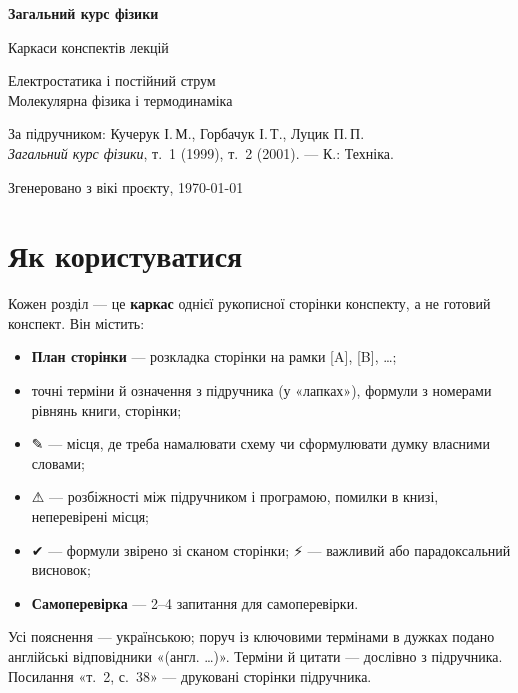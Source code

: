 \documentclass[11pt,a4paper,oneside]{book}
\newcommand{\pen}{{\sffamily\color{accent}✎}}
\newcommand{\warn}{{\sffamily\color{warncol}⚠}}
\newcommand{\ok}{{\sffamily\color{green!45!black}✔}}
\newcommand{\spark}{{\sffamily\color{warncol}⚡}}
\begin{document}
\frontmatter


\begin{titlepage}
\centering\sffamily
\vspace*{40mm}
{\Huge\bfseries\color{accent} Загальний курс фізики\par}
\vspace{6mm}
{\LARGE Каркаси конспектів лекцій\par}
\vspace{12mm}
{\large Електростатика і постійний струм\\[2mm] Молекулярна фізика і термодинаміка\par}
\vfill
{\normalsize За підручником: Кучерук І.\,М., Горбачук І.\,Т., Луцик П.\,П.\\
\textit{Загальний курс фізики}, т.~1 (1999), т.~2 (2001). — К.: Техніка.\par}
\vspace{8mm}
{\small Згенеровано з вікі проєкту, \today\par}
\end{titlepage}

\chapter*{Як користуватися}
Кожен розділ — це \textbf{каркас} однієї рукописної сторінки конспекту, а не готовий конспект. Він містить:
\begin{itemize}
\item \textbf{План сторінки} — розкладка сторінки на рамки [A], [B], …;
\item точні терміни й означення з підручника (у «лапках»), формули з номерами рівнянь книги, сторінки;
\item \pen{} — місця, де треба намалювати схему чи сформулювати думку власними словами;
\item \warn{} — розбіжності між підручником і програмою, помилки в книзі, неперевірені місця;
\item \ok{} — формули звірено зі сканом сторінки; \spark{} — важливий або парадоксальний висновок;
\item \textbf{Самоперевірка} — 2–4 запитання для самоперевірки.
\end{itemize}
Усі пояснення — українською; поруч із ключовими термінами в дужках подано англійські відповідники «(англ. …)». Терміни й цитати — дослівно з підручника. Посилання «т.~2, с.~38» — друковані сторінки підручника.
\end{document}
